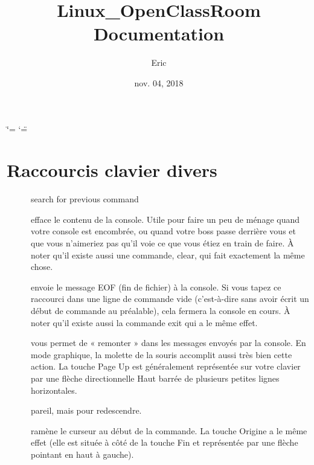 \documentclass[letterpaper,10pt,french]{sphinxmanual}
\title{Linux\_OpenClassRoom Documentation}
\date{nov. 04, 2018}
\author{Eric}
\begin{document}
\ifdefined\shorthandoff
  \ifnum\catcode`\=\string=\active\shorthandoff{=}\fi
  \ifnum\catcode`\"=\active{}\fi
\fi

\pagestyle{empty}
\maketitle
\pagestyle{plain}
\sphinxtableofcontents
\pagestyle{normal}
\label{\detokenize{index::doc}}



\chapter{Raccourcis clavier divers}
\label{\detokenize{01-shortcuts:raccourcis-clavier-divers}}\label{\detokenize{01-shortcuts::doc}}\begin{description}
\item[{}] \leavevmode
search for previous command

\item[{}] \leavevmode
efface le contenu de la console. Utile pour faire un peu de ménage quand votre console est encombrée, ou quand votre boss passe derrière vous et que vous n’aimeriez pas qu’il voie ce que vous étiez en train de faire. À noter qu’il existe aussi une commande, clear, qui fait exactement la même chose.

\item[{}] \leavevmode
envoie le message EOF (fin de fichier) à la console. Si vous tapez ce raccourci dans une ligne de commande vide (c’est-à-dire sans avoir écrit un début de commande au préalable), cela fermera la console en cours. À noter qu’il existe aussi la commande exit qui a le même effet.

\item[{}] \leavevmode
vous permet de « remonter » dans les messages envoyés par la console. En mode graphique, la molette de la souris accomplit aussi très bien cette action. La touche Page Up est généralement représentée sur votre clavier par une flèche directionnelle Haut barrée de plusieurs petites lignes horizontales.

\item[{}] \leavevmode
pareil, mais pour redescendre.

\item[{}] \leavevmode
ramène le curseur au début de la commande. La touche Origine a le même effet (elle est située à côté de la touche Fin et représentée par une flèche pointant en haut à gauche).


\end{description}
\end{document}
